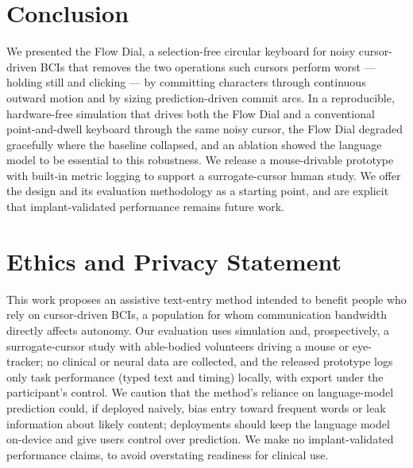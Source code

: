 \documentclass[manuscript,review,anonymous]{acmart}
\begin{document}
\section{Conclusion}
We presented the Flow Dial, a selection-free circular keyboard for noisy
cursor-driven BCIs that removes the two operations such cursors perform worst ---
holding still and clicking --- by committing characters through continuous
outward motion and by sizing prediction-driven commit arcs. In a reproducible,
hardware-free simulation that drives both the Flow Dial and a conventional
point-and-dwell keyboard through the same noisy cursor, the Flow Dial degraded
gracefully where the baseline collapsed, and an ablation showed the language
model to be essential to this robustness. We release a mouse-drivable prototype
with built-in metric logging to support a surrogate-cursor human study. We offer
the design and its evaluation methodology as a starting point, and are explicit
that implant-validated performance remains future work.

\section*{Ethics and Privacy Statement}
This work proposes an assistive text-entry method intended to benefit people who
rely on cursor-driven BCIs, a population for whom communication bandwidth
directly affects autonomy. Our evaluation uses simulation and, prospectively, a
surrogate-cursor study with able-bodied volunteers driving a mouse or
eye-tracker; no clinical or neural data are collected, and the released prototype
logs only task performance (typed text and timing) locally, with export under the
participant's control. We caution that the method's reliance on language-model
prediction could, if deployed naively, bias entry toward frequent words or leak
information about likely content; deployments should keep the language model
on-device and give users control over prediction. We make no implant-validated
performance claims, to avoid overstating readiness for clinical use.




\end{document}
